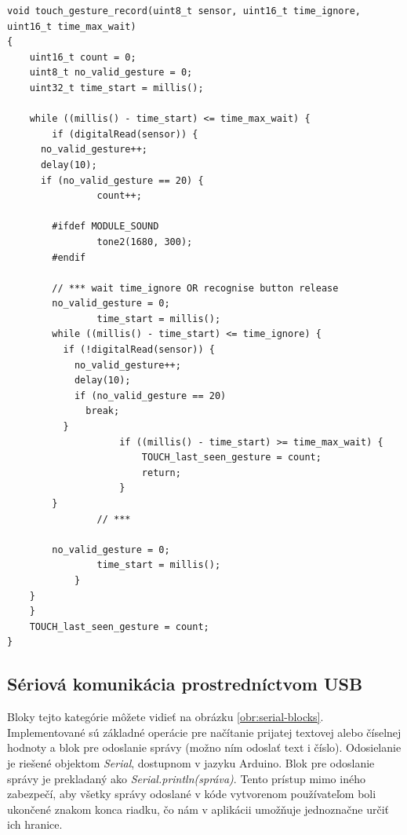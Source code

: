 
\newpage

\begin{lstlisting}[frame=single]
void touch_gesture_record(uint8_t sensor, uint16_t time_ignore, uint16_t time_max_wait)
{
	uint16_t count = 0;
	uint8_t no_valid_gesture = 0;
	uint32_t time_start = millis();

	while ((millis() - time_start) <= time_max_wait) {
		if (digitalRead(sensor)) {
      no_valid_gesture++;
      delay(10);
      if (no_valid_gesture == 20) {
				count++;
				
        #ifdef MODULE_SOUND
				tone2(1680, 300);
        #endif

        // *** wait time_ignore OR recognise button release
        no_valid_gesture = 0;
				time_start = millis();
        while ((millis() - time_start) <= time_ignore) {
          if (!digitalRead(sensor)) {
            no_valid_gesture++;
            delay(10);
            if (no_valid_gesture == 20)
              break;
          }
					if ((millis() - time_start) >= time_max_wait) {
						TOUCH_last_seen_gesture = count;
						return;
					}
        }
				// ***
        
        no_valid_gesture = 0;
				time_start = millis();
			}
    }
	}
	TOUCH_last_seen_gesture = count;
}

\end{lstlisting}



\subsection{Sériová komunikácia prostredníctvom USB}
Bloky tejto kategórie môžete vidieť na obrázku \ref{obr:serial-blocks}. Implementované sú základné operácie pre načítanie prijatej textovej alebo číselnej hodnoty a blok pre odoslanie správy (možno ním odoslať text i číslo). Odosielanie je riešené objektom \textit{Serial}, dostupnom v jazyku Arduino. Blok pre odoslanie správy je prekladaný ako \textit{Serial.println(správa)}. Tento prístup mimo iného zabezpečí, aby všetky správy odoslané v kóde vytvorenom používateľom boli ukončené znakom konca riadku, čo nám v aplikácii umožňuje jednoznačne určiť ich hranice.

